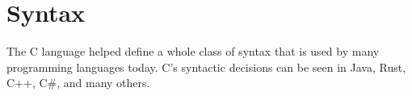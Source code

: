\section{Syntax}\label{sec:Syntax}
The C language helped define a whole class of syntax that is used by many programming languages today.
C's syntactic decisions can be seen in Java, Rust, C++, C\#, and many others.


